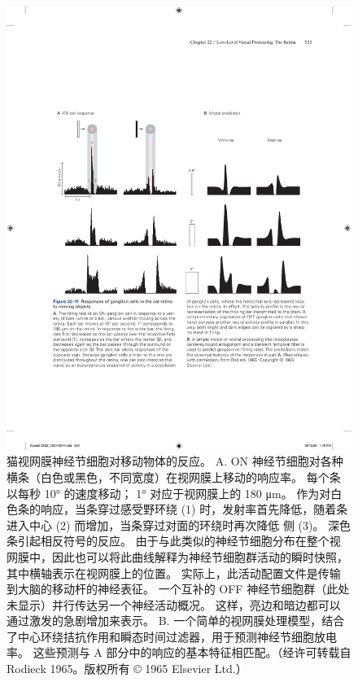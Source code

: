 \begin{figure}[htbp]
	\centering
	\includegraphics[width=1.0\linewidth]{chap22/fig_22_11}
	\caption{猫视网膜神经节细胞对移动物体的反应。 
		A. ON 神经节细胞对各种横条（白色或黑色，不同宽度）在视网膜上移动的响应率。 
		每个条以每秒 10° 的速度移动； 1° 对应于视网膜上的 180 μm。 作为对白色条的响应，当条穿过感受野环绕 (1) 时，发射率首先降低，随着条进入中心 (2) 而增加，当条穿过对面的环绕时再次降低 侧 (3)。 深色条引起相反符号的反应。 
		由于与此类似的神经节细胞分布在整个视网膜中，因此也可以将此曲线解释为神经节细胞群活动的瞬时快照，其中横轴表示在视网膜上的位置。 
		实际上，此活动配置文件是传输到大脑的移动杆的神经表征。 
		一个互补的 OFF 神经节细胞群（此处未显示）并行传达另一个神经活动概况。 这样，亮边和暗边都可以通过激发的急剧增加来表示。 
		B. 一个简单的视网膜处理模型，结合了中心环绕拮抗作用和瞬态时间过滤器，用于预测神经节细胞放电率。 
		这些预测与 A 部分中的响应的基本特征相匹配。（经许可转载自 Rodieck 1965。版权所有 © 1965 Elsevier Ltd.）}
	\label{fig:22_11}
\end{figure}

